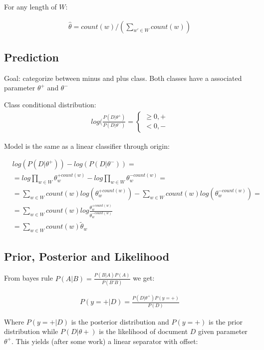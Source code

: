 For any length of $W$:

\begin{align*}
\hat{\theta} = count(w) / \left(\sum_{w'\in W}count(w) \right)
\end{align*}

\subsection{Prediction}

Goal: categorize between minus and plus class. Both classes have a associated parameter $\theta^{+}$ and $\theta^{-}$ 

Class conditional distribution:\\

\begin{align*}
log(\frac{P(D|\theta^{+})}{P(D|\theta^{-})} = 
\begin{cases} 
\geq 0, +\\
< 0, -
\end{cases}
\end{align*}

Model is the same as a linear classifier through origin:

\begin{align*}
&log(P(D|\theta^{+})) - log(P(D|\theta^{-})) =\\
&= log \prod_{w \in W} \theta_w^{+count(w)} - log \prod_{w \in W} \theta_w^{-count(w)} =\\
&= \sum_{w \in W} count(w) log(\theta_w^{+count(w)}) - \sum_{w \in W} count(w) log(\theta_w^{-count(w)}) =\\
&=\sum_{w \in W} count(w) log \frac{\theta_w^{+count(w)}}{\theta_w^{-count(w)}}\\
&= \sum_{w \in W} count(w) \tilde{\theta}_w
\end{align*}

\subsection{Prior, Posterior and Likelihood}

From bayes rule $P(A|B) = \frac{P(B|A)P(A)}{P(B'B)}$ we get:

\begin{align*}
P(y=+ | D) = \frac{ P(D | \theta ^{+})P(y = +)}{P(D)}
\end{align*}

Where $P(y=+|D)$ is the posterior distribution and $P(y=+)$ is the prior distribution while $P(D|\theta+)$ is the likelihood of document $D$ given parameter  $\theta^{+}$. This yields (after some work) a linear separator with offset:

